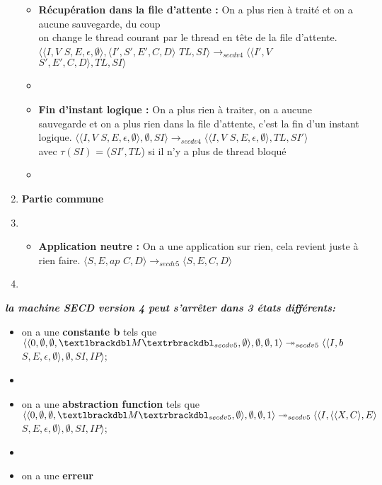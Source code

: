 \documentclass[10pt,a4paper]{article}
\begin{document}
\begin{enumerate}
\begin{itemize}
				\item[] \textbf{Récupération dans la file d'attente :} On a plus rien à traité et on a aucune sauvegarde, du coup 
				\\on change le thread courant par le thread en tête de la file d'attente.
				\smallbreak
				$\langle\langle I,V$ $S,E,\epsilon,\emptyset\rangle,\langle I',S',E',C,D\rangle$ $TL,SI\rangle 
				\longrightarrow_{secdv4} \langle\langle I',V$ $S',E',C,D\rangle,TL,SI\rangle$
				\item[]
				
				\item[] \textbf{Fin d'instant logique :} On a plus rien à traiter, on a aucune sauvegarde et on a plus rien dans la file d'attente, c'est la fin d'un instant logique.
				\smallbreak
				$\langle\langle I,V$ $S,E,\epsilon,\emptyset \rangle ,\emptyset,SI\rangle 
				\longrightarrow_{secdv4} \langle\langle I,V$ $S,E,\epsilon,\emptyset\rangle,TL,SI'\rangle$
				\\avec  $\tau(SI)$ = ($SI',TL$) si il n'y a plus de thread bloqué
				\item[]
				
			\end{itemize}
			\item[] \textbf{Partie commune} 
			\item[]
			\begin{itemize}
				\item[] \textbf{Application neutre :} On a une application sur rien, cela revient juste à rien faire.
				\smallbreak 
				$\langle S,E,ap$ $C,D\rangle
				\longrightarrow_{secdv5} \langle S,E,C,D\rangle$
			\end{itemize}
			
			\item[]
		\end{enumerate}
		\bigbreak
		\bigbreak
		
		
		\textbf{\textit{la machine SECD version 4 peut s'arrêter dans 3 états différents:}}
		\smallbreak
		\begin{itemize}
			\item[] on a une \textbf{constante b} tels que $\langle\langle 0,\emptyset,\emptyset,\textlbrackdbl M\textrbrackdbl_{secdv5},\emptyset\rangle,\emptyset,\emptyset,1\rangle 
			\twoheadrightarrow_{secdv5} \langle\langle I,b$ $S,E,\epsilon,\emptyset\rangle,\emptyset,SI,IP\rangle$;
			\item[] 
			\item[] on a une \textbf{abstraction function} tels que
			$\langle\langle 0,\emptyset,\emptyset,\textlbrackdbl M\textrbrackdbl_{secdv5},\emptyset\rangle,\emptyset,\emptyset,1\rangle 
			\twoheadrightarrow_{secdv5} \langle\langle I,\langle\langle X,C\rangle,E\rangle$ $S,E,\epsilon,\emptyset\rangle,\emptyset,SI,IP\rangle$;
			\item[] 
			\item[] on a une \textbf{erreur} 
		\end{itemize}
		\newpage
\end{document}
